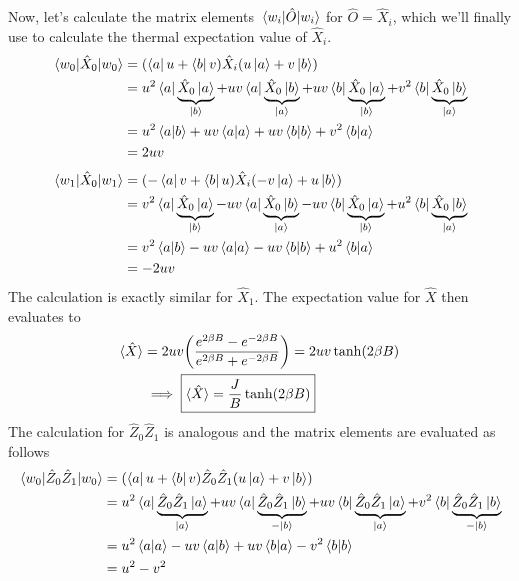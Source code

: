 \documentclass[../thesis_main.tex]{subfiles}
\begin{document}
Now, let's calculate the matrix elements $\mel{w_i}{\hat{O}}{w_i}$ for $\hat{O} = \hat{X}_i$, which we'll finally use to calculate the thermal expectation value of $\hat{X}_i$.
\begin{align*}
    \mel{w_0}{\hat{X}_0}{w_0} & = (\bra{a} u + \bra{b} v) \hat{X}_i (u \ket{a} + v \ket{b}) \\
    & = u^2 \bra{a}\underbrace{{\hat{X}_0}\ket{a}}_{\ket{b}} +  uv \bra{a}\underbrace{{\hat{X}_0}\ket{b}}_{\ket{a}} + uv \bra{b}\underbrace{{\hat{X}_0}\ket{a}}_{\ket{b}} + v^2 \bra{b}\underbrace{{\hat{X}_0}\ket{b}}_{\ket{a}} \\ 
    & = u^2 \braket{a}{b} + uv \braket{a}{a} + uv \braket{b}{b} + v^2\braket{b}{a} \\
    & = 2uv
\end{align*} 
\begin{align*}
    \mel{w_1}{\hat{X}_0}{w_1} & = (-\bra{a}v + \bra{b} u) \hat{X}_i (-v \ket{a} + u \ket{b}) \\
    & = v^2 \bra{a}\underbrace{{\hat{X}_0}\ket{a}}_{\ket{b}} -  uv \bra{a}\underbrace{{\hat{X}_0}\ket{b}}_{\ket{a}} - uv \bra{b}\underbrace{{\hat{X}_0}\ket{a}}_{\ket{b}} + u^2 \bra{b}\underbrace{{\hat{X}_0}\ket{b}}_{\ket{a}} \\ 
    & = v^2 \braket{a}{b} - uv \braket{a}{a} - uv \braket{b}{b} + u^2\braket{b}{a} \\
    & = -2uv
\end{align*} 
The calculation is exactly similar for $\hat{X}_1$. The expectation value for $\hat{X}$  then evaluates to 
\begin{align}
    \langle \hat{X} \rangle & = 2uv \qty(\frac{e^{2\beta B} - e^{-2\beta B}}{e^{2\beta B} + e^{-2\beta B}}) = 2uv \tanh (2\beta B) \nonumber \\ 
    & \implies \boxed{\langle{\hat{X}}\rangle = \frac{J}{B} \tanh(2\beta B)}
    \label{X-hat_expval}
\end{align}
The calculation for $\hat{Z}_0 \hat{Z}_1$ is analogous and the matrix elements are evaluated as follows
\begin{align*}
    \mel{w_0}{\hat{Z}_0 \hat{Z}_1}{w_0} & = (\bra{a} u + \bra{b} v) \hat{Z}_0 \hat{Z}_1 (u \ket{a} + v \ket{b}) \\
    & = u^2 \bra{a}\underbrace{{\hat{Z}_0 \hat{Z}_1}\ket{a}}_{\ket{a}} +  uv \bra{a}\underbrace{{\hat{Z}_0 \hat{Z}_1}\ket{b}}_{-\ket{b}} + uv \bra{b}\underbrace{{\hat{Z}_0 \hat{Z}_1}\ket{a}}_{\ket{a}} + v^2 \bra{b}\underbrace{{\hat{Z}_0 \hat{Z}_1}\ket{b}}_{-\ket{b}} \\ 
    & = u^2 \braket{a}{a} - uv \braket{a}{b} + uv \braket{b}{a} - v^2\braket{b}{b} \\
    & = u^2 - v^2
\end{align*} 
\end{document}
